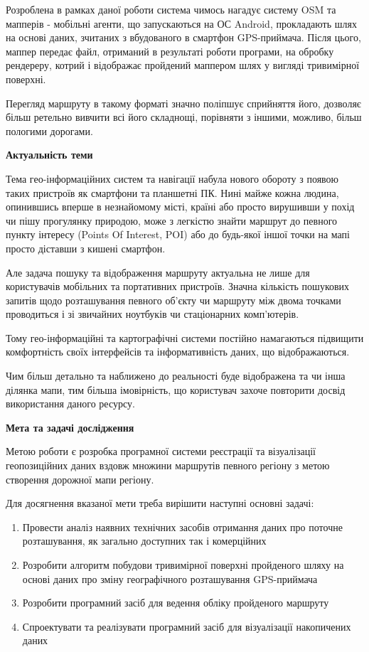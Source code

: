 \documentclass[simple,a4paper,14pt,ukrainian,utf8]{eskdtext}
\begin{document}
    Розроблена в рамках даної роботи система чимось нагадує систему OSM та мапперів - мобільні агенти, що запускаються на ОС Android, прокладають шлях на основі даних, зчитаних з вбудованого в смартфон GPS-приймача\cite{website:gps_receiver}. Після цього, маппер передає файл, отриманий в результаті роботи програми, на обробку рендереру, котрий і відображає пройдений маппером шлях у вигляді тривимірної поверхні.
    
    Перегляд маршруту в такому форматі значно поліпшує сприйняття його, дозволяє більш ретельно вивчити всі його складнощі, порівняти з іншими, можливо, більш пологими дорогами.
    
    \textbf{Актуальність теми}
    
    Тема гео-інформаційних систем та навігації набула нового обороту з появою таких пристроїв як смартфони та планшетні ПК. Нині майже кожна людина, опинившись вперше в незнайомому місті, країні або просто вирушивши у похід чи пішу прогулянку природою, може з легкістю знайти маршрут до певного пункту інтересу (Points Of Interest, POI) або до будь-якої іншої точки на мапі просто діставши з кишені смартфон.

	Але задача пошуку та відображення маршруту актуальна не лише для користувачів мобільних та портативних пристроїв. Значна кількість пошукових запитів щодо розташування певного об’єкту чи маршруту між двома точками проводиться і зі звичайних ноутбуків чи стаціонарних комп’ютерів.

	Тому гео-інформаційні та картографічні системи постійно намагаються підвищити комфортність своїх інтерфейсів та інформативність даних, що відображаються.

	Чим більш детально та наближено до реальності буде відображена та чи інша ділянка мапи, тим більша імовірність, що користувач захоче повторити досвід використання даного ресурсу.

	\textbf{Мета та задачі дослідження}
		
	Метою роботи є розробка програмної системи реєстрації та візуалізації геопозиційних даних вздовж множини маршрутів певного регіону з метою створення дорожної мапи регіону.

	Для досягнення вказаної мети треба вирішити наступні основні задачі:
		
	\begin{enumerate}
		\item Провести аналіз наявних технічних засобів отримання даних про поточне розташування, як загально доступних так і комерційних
		\item Розробити алгоритм побудови тривимірної поверхні пройденого шляху на основі даних про зміну географічного розташування GPS-приймача
		\item Розробити програмний засіб для ведення обліку пройденого маршруту
		\item Спроектувати та реалізувати програмний засіб для візуалізації накопичених даних
	\end{enumerate}
	
\end{document}

